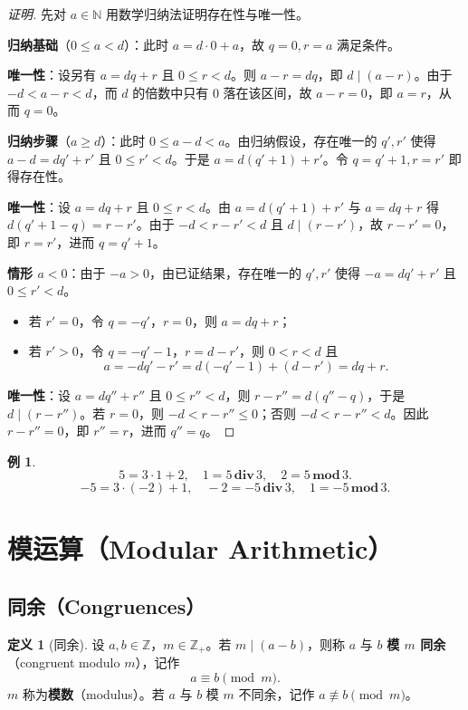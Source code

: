 \documentclass[UTF8,11pt,a4paper]{ctexbook}   %
\theoremstyle{definition}
\newtheorem{definition}{定义}[section]
\newtheorem{example}{例}[section]
\begin{document}
\begin{proof}[证明]
先对 $a\in\mathbb{N}$ 用数学归纳法证明存在性与唯一性。

\textbf{归纳基础}（$0\le a<d$）：此时 $a = d\cdot 0 + a$，故 $q=0,r=a$ 满足条件。

\textbf{唯一性}：设另有 $a=dq+r$ 且 $0\le r<d$。则 $a-r=dq$，即 $d\mid(a-r)$。由于 $-d<a-r<d$，而 $d$ 的倍数中只有 $0$ 落在该区间，故 $a-r=0$，即 $a=r$，从而 $q=0$。

\textbf{归纳步骤}（$a\ge d$）：此时 $0\le a-d<a$。由归纳假设，存在唯一的 $q',r'$ 使得 $a-d=dq'+r'$ 且 $0\le r'<d$。于是 $a=d(q'+1)+r'$。令 $q=q'+1,r=r'$ 即得存在性。

\textbf{唯一性}：设 $a=dq+r$ 且 $0\le r<d$。由 $a=d(q'+1)+r'$ 与 $a=dq+r$ 得 $d(q'+1-q)=r-r'$。由于 $-d<r-r'<d$ 且 $d\mid(r-r')$，故 $r-r'=0$，即 $r=r'$，进而 $q=q'+1$。

\textbf{情形 $a<0$}：由于 $-a>0$，由已证结果，存在唯一的 $q',r'$ 使得 $-a=dq'+r'$ 且 $0\le r'<d$。
\begin{itemize}
    \item 若 $r'=0$，令 $q=-q'$，$r=0$，则 $a=dq+r$；
    \item 若 $r'>0$，令 $q=-q'-1$，$r=d-r'$，则 $0<r<d$ 且
    \[ a = -dq'-r' = d(-q'-1)+(d-r') = dq+r. \]
\end{itemize}
\textbf{唯一性}：设 $a=dq''+r''$ 且 $0\le r''<d$，则 $r-r''=d(q''-q)$，于是 $d\mid(r-r'')$。若 $r=0$，则 $-d<r-r''\le 0$；否则 $-d<r-r''<d$。因此 $r-r''=0$，即 $r''=r$，进而 $q''=q$。
\end{proof}

\begin{example}
\[ 5 = 3\cdot 1 + 2,\quad 1 = 5\,\mathbf{div}\,3,\quad 2 = 5\,\mathbf{mod}\,3. \]
\[ -5 = 3\cdot(-2) + 1,\quad -2 = -5\,\mathbf{div}\,3,\quad 1 = -5\,\mathbf{mod}\,3. \]
\end{example}

\section{模运算（Modular Arithmetic）}

\subsection{同余（Congruences）}

\begin{definition}[同余]
设 $a,b\in\mathbb{Z}$，$m\in\mathbb{Z}_+$。若 $m\mid(a-b)$，则称 $a$ 与 $b$ \textbf{模 $m$ 同余}（congruent modulo $m$），记作
\[ a\equiv b\pmod{m}. \]
$m$ 称为\textbf{模数}（modulus）。若 $a$ 与 $b$ 模 $m$ 不同余，记作 $a\not\equiv b\pmod{m}$。
\end{definition}
\end{document}
